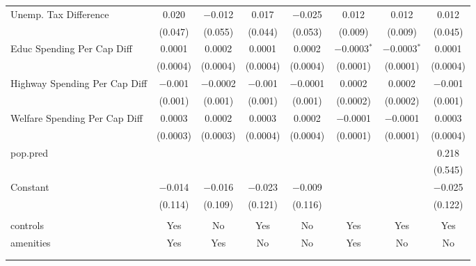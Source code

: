 \begin{table}[!htbp]
\begin{tabular}{@{\extracolsep{5pt}}lccccccc}
  Unemp. Tax Difference & 0.020 & $-$0.012 & 0.017 & $-$0.025 & 0.012 & 0.012 & 0.012 \\ 
  & (0.047) & (0.055) & (0.044) & (0.053) & (0.009) & (0.009) & (0.045) \\ 
  Educ Spending Per Cap Diff & 0.0001 & 0.0002 & 0.0001 & 0.0002 & $-$0.0003$^{*}$ & $-$0.0003$^{*}$ & 0.0001 \\ 
  & (0.0004) & (0.0004) & (0.0004) & (0.0004) & (0.0001) & (0.0001) & (0.0004) \\ 
  Highway Spending Per Cap Diff & $-$0.001 & $-$0.0002 & $-$0.001 & $-$0.0001 & 0.0002 & 0.0002 & $-$0.001 \\ 
  & (0.001) & (0.001) & (0.001) & (0.001) & (0.0002) & (0.0002) & (0.001) \\ 
  Welfare Spending Per Cap Diff & 0.0003 & 0.0002 & 0.0003 & 0.0002 & $-$0.0001 & $-$0.0001 & 0.0003 \\ 
  & (0.0003) & (0.0003) & (0.0004) & (0.0004) & (0.0001) & (0.0001) & (0.0004) \\ 
  pop.pred &  &  &  &  &  &  & 0.218 \\ 
  &  &  &  &  &  &  & (0.545) \\ 
  Constant & $-$0.014 & $-$0.016 & $-$0.023 & $-$0.009 &  &  & $-$0.025 \\ 
  & (0.114) & (0.109) & (0.121) & (0.116) &  &  & (0.122) \\ 
 \hline \\[-1.8ex] 
controls & Yes & No & Yes & No & Yes & Yes & Yes \\ 
amenities & Yes & Yes & No & No & Yes & No & No \\ 
\hline \\[-1.8ex] 
\hline 
\hline \\[-1.8ex] 
\end{tabular} 
\end{table} 
